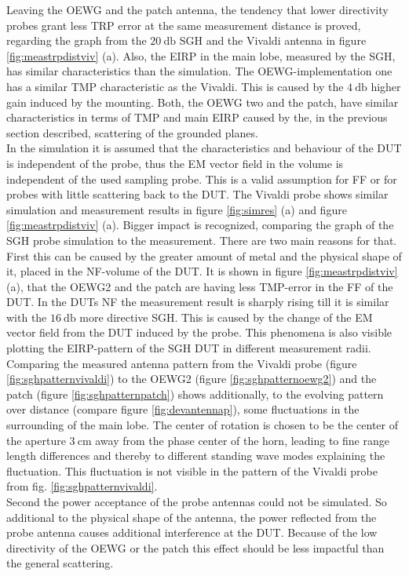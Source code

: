 Leaving the \ac{OEWG} and the patch antenna, the tendency that lower directivity probes grant less \ac{TRP} error at the same measurement distance is proved, regarding the graph from the $\SI{20}{\decibel}$ \ac{SGH} and the Vivaldi antenna in figure \ref{fig:meastrpdistviv} (a). Also, the \ac{EIRP} in the main lobe, measured by the \ac{SGH}, has similar characteristics than the simulation. The \ac{OEWG}-implementation one has a similar \ac{TMP} characteristic as the Vivaldi. This is caused by the $\SI{4}{\decibel}$ higher gain induced by the mounting. Both, the \ac{OEWG} two and the patch, have similar characteristics in terms of \ac{TMP} and main \ac{EIRP} caused by the, in the previous section described, scattering of the grounded planes.\\
In the simulation it is assumed that the characteristics and behaviour of the \ac{DUT} is independent of the probe, thus the EM vector field in the volume is independent of the used sampling probe. This is a valid assumption for \ac{FF} or for probes with little scattering back to the \ac{DUT}. 
The Vivaldi probe shows similar simulation and measurement results in figure \ref{fig:simres} (a) and figure \ref{fig:meastrpdistviv} (a). Bigger impact is recognized, comparing the graph of the \ac{SGH} probe simulation to the measurement. 
There are two main reasons for that. First this can be caused by the greater amount of metal and the physical shape of it, placed in the \ac{NF}-volume of the \ac{DUT}.
It is shown in figure \ref{fig:meastrpdistviv} (a), that the \ac{OEWG}2 and the patch are having less \ac{TMP}-error in the \ac{FF} of the \ac{DUT}. In the \ac{DUT}s \ac{NF} the measurement result is sharply rising till it is similar with the $\SI{16}{\decibel}$ more directive \ac{SGH}.
This is caused by the change of the \ac{EM} vector field from the \ac{DUT} induced by the probe. This phenomena is also visible plotting the \ac{EIRP}-pattern of the \ac{SGH} \ac{DUT} in different measurement radii.
Comparing the measured antenna pattern from the Vivaldi probe (figure \ref{fig:sghpatternvivaldi}) to the \ac{OEWG}2 (figure \ref{fig:sghpatternoewg2}) and the patch (figure \ref{fig:sghpatternpatch}) shows additionally, to the evolving pattern over distance (compare figure \ref{fig:devantennap}), some fluctuations in the surrounding of the main lobe.
The center of rotation is chosen to be the center of the aperture $\SI{3}{\centi\meter}$ away from the phase center of the horn, leading to fine range length differences and thereby to different standing wave modes explaining the fluctuation.
This fluctuation is not visible in the pattern of the Vivaldi probe from fig. \ref{fig:sghpatternvivaldi}.\\
Second the power acceptance of the probe antennas could not be simulated. So additional to the physical shape of the antenna, the power reflected from the probe antenna causes additional interference at the \ac{DUT}. Because of the low directivity of the \ac{OEWG} or the patch this effect should be less impactful than the general scattering.

